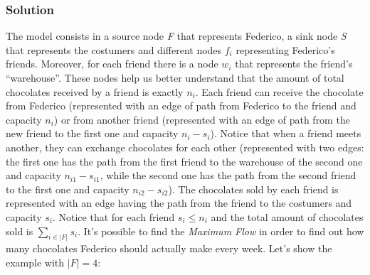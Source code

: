 \documentclass[11pt]{article}
\begin{document}
\subsubsection*{Solution}
The model consists in a source node \textit{F} that represents Federico, a sink node \textit{S} that represents the costumers and different nodes $f_i$ representing Federico's friends. Moreover, for each friend there is a node $w_i$ that represents the friend's ``warehouse''. These nodes help us better understand that the amount of total chocolates received by a friend is exactly $n_i$. Each friend can receive the chocolate from Federico (represented with an edge of path from Federico to the friend and capacity $n_i$) or from another friend (represented with an edge of path from the new friend to the first one and capacity $n_i - s_i$). Notice that when a friend meets another, they can exchange chocolates for each other (represented with two edges: the first one has the path from the first friend to the warehouse of the second one and capacity $n_{i1} - s_{i1}$, while the second one has the path from the second friend to the first one and capacity $n_{i2} - s_{i2}$). The chocolates sold by each friend is represented with an edge having the path from the friend to the costumers and capacity $s_i$. Notice that for each friend $s_i \le n_i$ and the total amount of chocolates sold is $\sum\limits_{i \in |F|}s_i$. It's possible to find the \textit{Maximum Flow} in order to find out how many chocolates Federico should
actually make every week. Let's show the example with $|F| = 4$:
\end{document}
